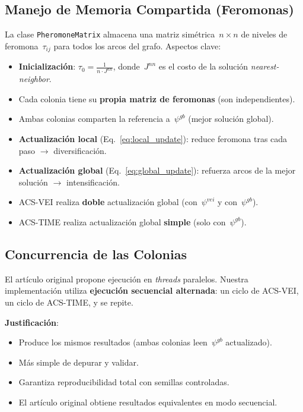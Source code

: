 \documentclass[12pt, letterpaper]{article}
\begin{document}
\subsection{Manejo de Memoria Compartida (Feromonas)}

La clase \texttt{PheromoneMatrix} almacena una matriz simétrica~$n \times n$ de niveles de feromona~$\tau_{ij}$ para todos los arcos del grafo. Aspectos clave:

\begin{itemize}[leftmargin=2cm]
  \item \textbf{Inicialización}: $\tau_0 = \frac{1}{n \cdot J^{nn}}$, donde~$J^{nn}$ es el costo de la solución \textit{nearest-neighbor}.
  \item Cada colonia tiene su \textbf{propia matriz de feromonas} (son independientes).
  \item Ambas colonias comparten la referencia a~$\psi^{gb}$ (mejor solución global).
  \item \textbf{Actualización local} (Eq.~\ref{eq:local_update}): reduce feromona tras cada paso $\rightarrow$ diversificación.
  \item \textbf{Actualización global} (Eq.~\ref{eq:global_update}): refuerza arcos de la mejor solución $\rightarrow$ intensificación.
  \item ACS-VEI realiza \textbf{doble} actualización global (con~$\psi^{vei}$ y con~$\psi^{gb}$).
  \item ACS-TIME realiza actualización global \textbf{simple} (solo con~$\psi^{gb}$).
\end{itemize}

\subsection{Concurrencia de las Colonias}

El artículo original propone ejecución en \textit{threads} paralelos. Nuestra implementación utiliza \textbf{ejecución secuencial alternada}: un ciclo de ACS-VEI, un ciclo de ACS-TIME, y se repite.

\textbf{Justificación}:
\begin{itemize}[leftmargin=2cm]
  \item Produce los mismos resultados (ambas colonias leen~$\psi^{gb}$ actualizado).
  \item Más simple de depurar y validar.
  \item Garantiza reproducibilidad total con semillas controladas.
  \item El artículo original obtiene resultados equivalentes en modo secuencial.
\end{itemize}
\end{document}
